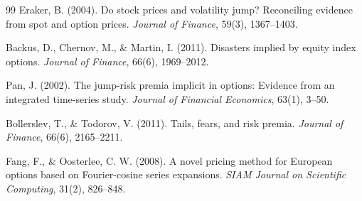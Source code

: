\documentclass[12pt]{article}
\begin{document}
\begin{thebibliography}{99}
Eraker, B. (2004).
Do stock prices and volatility jump? Reconciling evidence from spot and option prices.
\textit{Journal of Finance}, 59(3), 1367--1403.

Backus, D., Chernov, M., \& Martin, I. (2011).
Disasters implied by equity index options.
\textit{Journal of Finance}, 66(6), 1969--2012.

Pan, J. (2002).
The jump-risk premia implicit in options: Evidence from an integrated time-series study.
\textit{Journal of Financial Economics}, 63(1), 3--50.

Bollerslev, T., \& Todorov, V. (2011).
Tails, fears, and risk premia.
\textit{Journal of Finance}, 66(6), 2165--2211.

Fang, F., \& Oosterlee, C. W. (2008).
A novel pricing method for European options based on Fourier-cosine series expansions.
\textit{SIAM Journal on Scientific Computing}, 31(2), 826--848.


\end{thebibliography}
\end{document}
